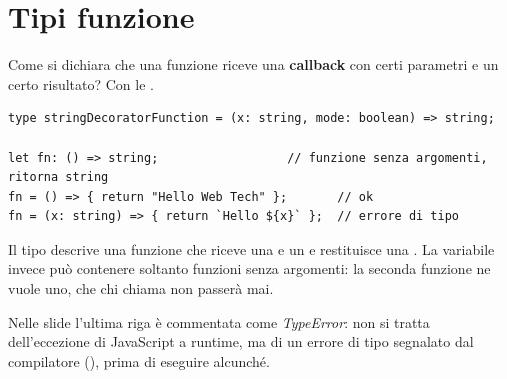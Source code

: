 
\section{Tipi funzione}

Come si dichiara che una funzione riceve una \textbf{callback} con certi
parametri e un certo risultato? Con le .

\begin{lstlisting}[style=ts, name=function_types.ts]
type stringDecoratorFunction = (x: string, mode: boolean) => string;

let fn: () => string;                  // funzione senza argomenti, ritorna string
fn = () => { return "Hello Web Tech" };       // ok
fn = (x: string) => { return `Hello ${x}` };  // errore di tipo
\end{lstlisting}

Il tipo  descrive una funzione che riceve una
 e un  e restituisce una . La variabile
 invece può contenere soltanto funzioni senza argomenti: la seconda
funzione ne vuole uno, che chi chiama  non passerà mai.


Nelle slide l'ultima riga è commentata come \textit{TypeError}: non si tratta
dell'eccezione di JavaScript a runtime, ma di un errore di tipo segnalato dal
compilatore (), prima di eseguire alcunché.

